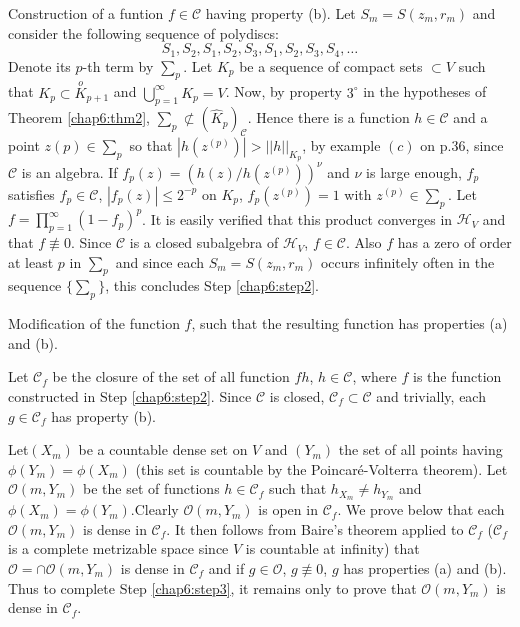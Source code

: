 \begin{step}\label{chap6:step2}
Construction of a funtion $f \in \mathscr{C}$ having property (b). 
Let $S_m = S(z_m, r_m)$ and consider the following sequence of
polydiscs:
$$
S_1, S_2, S_1, S_2, S_3, S_1, S_2, S_3, S_4, \ldots
$$
Denote its $p$-th term by $\sum_p$. Let $K_p$ be a sequence of compact
sets $\subset V$ such that $K_p \subset \overset{o}{K}_{p+1}$ and
$\bigcup\limits^\infty_{p =1} K_p = V$. Now, by property $3^\circ$ in
the hypotheses of Theorem \ref{chap6:thm2}, $\sum_p \not\subset
(\hat{K}_p)_{\mathscr{C}}$. Hence there is a function $h
\in\mathscr{C}$ and a point $z(p) \in \sum_p$ so that $|h (z^{(p)})| >
||h||_{K_p}$, by example $(c)$ on p.36, since $\mathscr{C}$ is an
algebra. If $f_p(z) = (h(z)/ h (z^{(p)}))^\nu$ and $\nu$ is large
enough, $f_p$ satisfies $f_p \in\mathscr{C}$, $|f_p(z)| \leq 2^{-p}$
on $K_p$, $f_p(z^{(p)}) =1$ with $z^{(p)} \in \sum_p$. Let $f=
\prod\limits^\infty_{p=1} (1-f_p)^p$. It is easily verified that this
product converges in $\mathscr{H}_V$ and that $f \not\equiv 0$. Since
$\mathscr{C}$ is a closed subalgebra of $\mathscr{H}_V$, $f
\in\mathscr{C}$. Also $f$ has a zero of order at least $p$ in $\sum_p$
and since each $S_m = S(z_m, r_m)$ occurs infinitely often in the
sequence $\{\sum_p\}$, this concludes Step \ref{chap6:step2}. 
\end{step}

\begin{step}\label{chap6:step3}
Modification of the function $f$, such that the resulting function has
properties (a) and (b). 
\end{step}

Let $\mathscr{C}_f$ be the closure of the set of all function $f h$,
$h\in \mathscr{C}$, where $f$ is the function constructed in Step
\ref{chap6:step2}. Since $\mathscr{C}$ is closed, $\mathscr{C}_f
\subset \mathscr{C}$ 
and trivially, each $g \in\mathscr{C}_f$ has property (b).

Let\pageoriginale $(X_m)$ be a countable dense set on $V$ and $(Y_m)$
the set of all points having $\phi(Y_m) = \phi(X_m)$ (this set is
countable by the Poincar\'e-Volterra theorem). Let
$\mathscr{O}(m,Y_m)$ be the set of functions $h \in \mathscr{C}_f$
such that $h_{X_m} \neq h_{Y_m}$ and $\phi(X_m) = \phi(Y_m)$.Clearly
$\mathscr{O} (m, Y_m)$ is open in $\mathscr{C}_f$. We prove below that
each $\mathscr{O}(m, Y_m)$ is dense in $\mathscr{C}_f$. It then
follows from Baire's theorem applied to $\mathscr{C}_f$
($\mathscr{C}_f$ is a complete metrizable space since $V$ is countable
at infinity) that $\mathscr{O} = \cap \mathscr{O} (m, Y_m)$ is dense
in $\mathscr{C}_f$ and if $g \in \mathscr{O}$, $g \not\equiv 0$, $g$
has properties (a) and (b). Thus to complete Step \ref{chap6:step3},
it remains only 
to prove that $\mathscr{O} (m, Y_m)$ is dense in $\mathscr{C}_f$.

